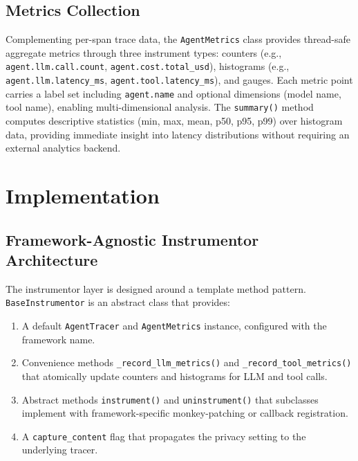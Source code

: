 \documentclass[sigconf,nonacm]{acmart}
\begin{document}
\subsection{Metrics Collection}
\label{sec:metrics}

Complementing per-span trace data, the \texttt{AgentMetrics} class
provides thread-safe aggregate metrics through three instrument types:
counters (e.g., \texttt{agent.llm.call.count},
\texttt{agent.cost.total\_usd}), histograms (e.g.,
\texttt{agent.llm.latency\_ms}, \texttt{agent.tool.latency\_ms}), and
gauges.  Each metric point carries a label set including
\texttt{agent.name} and optional dimensions (model name, tool name),
enabling multi-dimensional analysis.  The \texttt{summary()} method
computes descriptive statistics (min, max, mean, p50, p95, p99) over
histogram data, providing immediate insight into latency distributions
without requiring an external analytics backend.

\section{Implementation}
\label{sec:implementation}

\subsection{Framework-Agnostic Instrumentor Architecture}
\label{sec:instrumentor}

The instrumentor layer is designed around a template method pattern.
\texttt{BaseInstrumentor} is an abstract class that provides:

\begin{enumerate}[leftmargin=*,nosep]
    \item A default \texttt{AgentTracer} and \texttt{AgentMetrics}
        instance, configured with the framework name.
    \item Convenience methods \texttt{\_record\_llm\_metrics()} and
        \texttt{\_record\_tool\_metrics()} that atomically update
        counters and histograms for LLM and tool calls.
    \item Abstract methods \texttt{instrument()} and
        \texttt{uninstrument()} that subclasses implement with
        framework-specific monkey-patching or callback registration.
    \item A \texttt{capture\_content} flag that propagates the
        privacy setting to the underlying tracer.
\end{enumerate}
\end{document}
